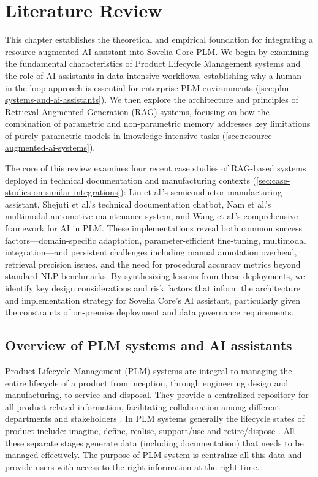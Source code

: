\chapter{Literature Review}
\label{ch:literature-review}

This chapter establishes the theoretical and empirical foundation for integrating a resource-augmented AI assistant into Sovelia Core PLM. We begin by examining the fundamental characteristics of Product Lifecycle Management systems and the role of AI assistants in data-intensive workflows, establishing why a human-in-the-loop approach is essential for enterprise PLM environments (\autoref{sec:plm-systems-and-ai-assistants}). We then explore the architecture and principles of Retrieval-Augmented Generation (RAG) systems, focusing on how the combination of parametric and non-parametric memory addresses key limitations of purely parametric models in knowledge-intensive tasks (\autoref{sec:resource-augmented-ai-systems}).

The core of this review examines four recent case studies of RAG-based systems deployed in technical documentation and manufacturing contexts (\autoref{sec:case-studies-on-similar-integrations}): Lin et al.'s semiconductor manufacturing assistant, Shejuti et al.'s technical documentation chatbot, Nam et al.'s multimodal automotive maintenance system, and Wang et al.'s comprehensive framework for AI in PLM. These implementations reveal both common success factors—domain-specific adaptation, parameter-efficient fine-tuning, multimodal integration—and persistent challenges including manual annotation overhead, retrieval precision issues, and the need for procedural accuracy metrics beyond standard NLP benchmarks. By synthesizing lessons from these deployments, we identify key design considerations and risk factors that inform the architecture and implementation strategy for Sovelia Core's AI assistant, particularly given the constraints of on-premise deployment and data governance requirements.

\section{Overview of PLM systems and AI assistants}
\label{sec:plm-systems-and-ai-assistants}

Product Lifecycle Management (PLM) systems are integral to managing the entire lifecycle of a product from inception, through engineering design and manufacturing, to service and disposal. They provide a centralized repository for all product-related information, facilitating collaboration among different departments and stakeholders \parencite{stark_product_2015}. In PLM systems generally the lifecycle states of product include: imagine, define, realise, support/use and retire/dispose \parencite{stark_product_2015-1}. All these separate stages generate data (including documentation) that needs to be managed effectively. The purpose of PLM system is centralize all this data and provide users with access to the right information at the right time.

